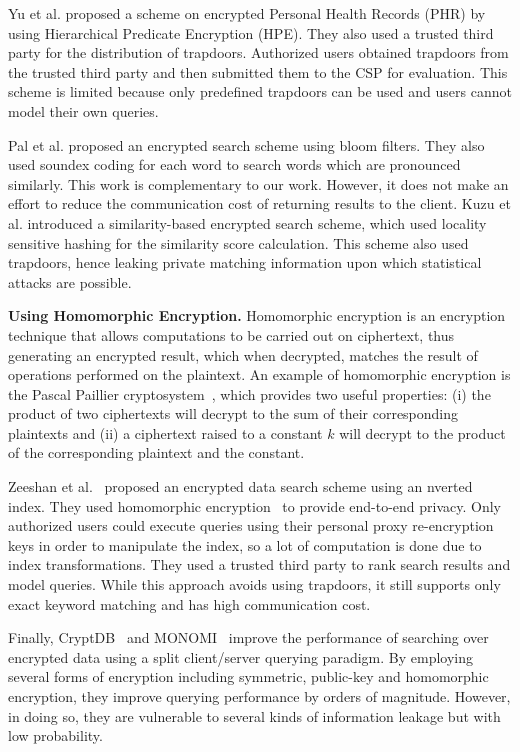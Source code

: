 Yu et al. \cite{li} proposed a scheme on encrypted Personal Health Records
(PHR) by using Hierarchical Predicate Encryption (HPE). They also used a 
trusted third party for the distribution of trapdoors. 
Authorized users obtained trapdoors from the trusted third party and then 
submitted them to the CSP for evaluation. This scheme is limited because only 
predefined trapdoors can be used and users cannot model their own queries.

Pal et al. \cite{saibal} proposed an encrypted search scheme using bloom filters. They
also used soundex coding\cite{odell1918soundex} for each word to search words
which are pronounced similarly. This work is complementary to our work. However, it
does not make an effort to reduce the communication cost of returning results to the
client. Kuzu et al.\cite{mehmat} introduced a similarity-based encrypted search scheme,
which used locality sensitive hashing for the similarity score calculation.
This scheme also used trapdoors, hence leaking private matching information
upon which statistical attacks are possible. 


\textbf{Using Homomorphic Encryption.}
Homomorphic encryption is an encryption technique that
allows computations to be carried out on ciphertext, thus generating an 
encrypted result, which when decrypted, matches the result of operations performed 
on the plaintext. An example of homomorphic encryption is the Pascal Paillier 
cryptosystem~\cite{pascal}, which provides two useful properties: 
(i) the product of two ciphertexts will decrypt to the sum of their corresponding plaintexts
and (ii) a ciphertext raised to a constant $k$ will decrypt to the product of the 
corresponding plaintext and the constant.

Zeeshan et al.~\cite{zeehan} proposed an encrypted data search scheme using an nverted index.
They used homomorphic encryption~\cite{craig} to provide end-to-end privacy. Only
authorized users could execute queries using their personal proxy re-encryption keys in
order to manipulate the index, so a lot of computation is done due to index
transformations. They used a trusted third party to rank search results and model queries.
While this approach avoids using trapdoors, it still supports only
exact keyword matching and has high communication cost.

Finally, CryptDB~\cite{popa2011cryptdb} and MONOMI~\cite{tu2013processing} improve the performance of searching over encrypted data using
a split client/server querying paradigm. By employing several forms of encryption including
symmetric, public-key and homomorphic encryption, they improve querying performance by orders
of magnitude. However, in doing so, they are vulnerable to several kinds of information leakage 
but with low probability.
